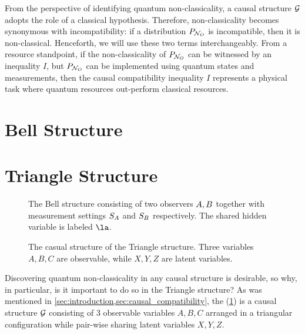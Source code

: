 \documentclass[aps, 10pt, english, twoside, pra, nofootinbib, tightenlines, longbibliography, superscriptaddress]{revtex4-1}
\begin{document}
    From the perspective of identifying quantum non-classicality, a causal structure $\mathcal{G}$ adopts the role of a classical hypothesis. Therefore, non-classicality becomes synonymous with incompatibility: if a distribution $\prob[\nodes_{O}]$ is incompatible, then it is non-classical. Henceforth, we will use these two terms interchangeably. From a resource standpoint, if the non-classicality of $\prob[\nodes_{O}]$ can be witnessed by an inequality $I$, but $\prob[\nodes_{O}]$ can be implemented using quantum states and measurements, then the causal compatibility inequality $I$ represents a physical task where quantum resources out-perform classical resources.

    \section{Bell Structure}
    \label{sec:bell_structure}

    \section{Triangle Structure}
    \label{sec:triangle_structure}

    \begin{figure}
    \begin{center}
        \begin{minipage}[t]{.48\textwidth}
            \centering
            \scalebox{1.0}{}
            \caption{The Bell structure consisting of two observers $A, B$ together with measurement settings $S_{A}$ and $S_{B}$ respectively. The shared hidden variable is labeled $\la$.}
            \label{fig:bell_scenario}
        \end{minipage}\hspace{0.04\textwidth}%
        \begin{minipage}[t]{.48\textwidth}
            \centering
            \scalebox{1.0}{}
            \caption{The casual structure of the Triangle structure. Three variables $A,B,C$ are observable, while $X, Y, Z$ are latent variables.}
            \label{fig:triangle_structure}
        \end{minipage}
    \end{center}
    \end{figure}
    Discovering quantum non-classicality in any causal structure is desirable, so why, in particular, is it important to do so in the Triangle structure? As was mentioned in \cref{sec:introduction,sec:causal_compatibility}, the  (\cref{fig:triangle_structure}) is a causal structure $\mathcal{G}$ consisting of $3$ observable variables $A, B, C$ arranged in a triangular configuration while pair-wise sharing latent variables $X, Y, Z$.
\end{document}

